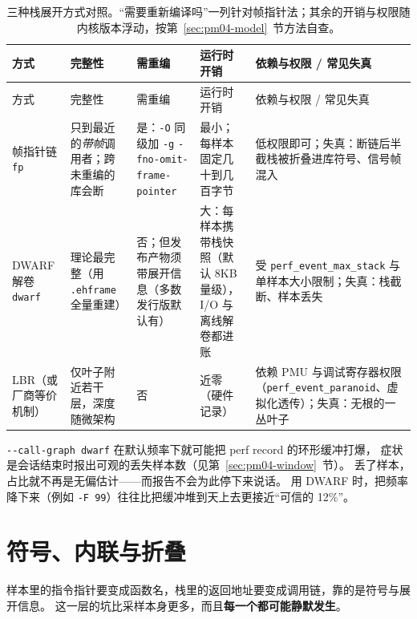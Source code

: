 \documentclass[12pt,a4paper,fontset=fandol]{ctexbook}
\newcommand{\Tp}[1]{\texttt{#1}}
\newcommand{\Opt}[1]{\texttt{-\/-#1}}
\newcommand{\Bk}{\discretionary{}{}{}}
\begin{document}
\begin{longtable}{>{\raggedright\arraybackslash}p{} >{\raggedright\arraybackslash}p{} >{\raggedright\arraybackslash}p{} >{\raggedright\arraybackslash}p{} >{\raggedright\arraybackslash}p{}}
\caption{三种栈展开方式对照。``需要重新编译吗''一列针对帧指针法；其余的开销与权限随内核版本浮动，按第~\ref{sec:pm04-model}~节方法自查。\label{tab:pm04-unwind}}\\
\hline
方式 & 完整性 & 需重编 & 运行时开销 & 依赖与权限 / 常见失真 \\ \hline
\endfirsthead
\hline
方式 & 完整性 & 需重编 & 运行时开销 & 依赖与权限 / 常见失真 \\ \hline
\endhead
\hline
\endfoot
帧指针链 \Tp{fp} &
只到最近的\emph{带帧}调用者；跨未重编的库会断 &
是：\Tp{-O} 同级加 \Tp{-g} \Tp{-fno-{\Bk}omit{\Bk}-frame{\Bk}-pointer} &
最小；每样本固定几十到几百字节 &
低权限即可；失真：断链后半截栈被折叠进库符号、信号帧混入 \\
DWARF 解卷 \Tp{dwarf} &
理论最完整（用 \Tp{.eh{\Bk}frame} 全量重建）&
否；但发布产物须带展开信息（多数发行版默认有）&
大：每样本携带栈快照（默认 8KB 量级），I/O 与离线解卷都进账 &
受 \Tp{perf{\Bk}\_event{\Bk}\_max{\Bk}\_stack} 与单样本大小限制；失真：栈截断、样本丢失 \\
LBR（或厂商等价机制）&
仅叶子附近若干层，深度随微架构 &
否 &
近零（硬件记录）&
依赖 PMU 与调试寄存器权限（\Tp{perf{\Bk}\_event{\Bk}\_paranoid}、虚拟化透传）；失真：无根的一丛叶子 \\
\end{longtable}

\begin{warning}[title={DWARF 的缓冲代价会被``默认值''藏起来}]
\Opt{call-graph dwarf} 在默认频率下就可能把 perf record 的环形缓冲打爆，
症状是会话结束时报出可观的丢失样本数（见第~\ref{sec:pm04-window}~节）。
丢了样本，占比就不再是无偏估计——而报告不会为此停下来说话。
用 DWARF 时，把频率降下来（例如 \Tp{-F 99}）往往比把缓冲堆到天上去更接近``可信的 12\%''。
\end{warning}

\section{符号、内联与折叠}
\label{sec:pm04-symbols}

样本里的指令指针要变成函数名，栈里的返回地址要变成调用链，靠的是符号与展开信息。
这一层的坑比采样本身更多，而且\textbf{每一个都可能静默发生}。
\end{document}
